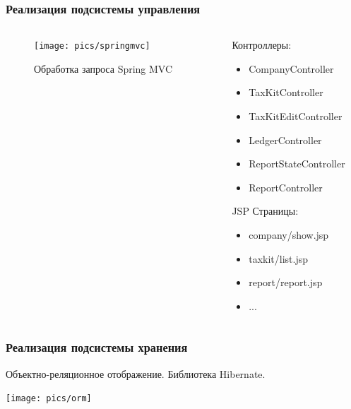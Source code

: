 \documentclass[xcolor=pdftex, dvipsnames, table]{beamer}
\begin{document}
\begin{frame}
  \frametitle{Реализация подсистемы управления}
  \begin{columns}
    \begin{column}{0.6\textwidth}
      \begin{center}
        \begin{figure}
          \texttt{[image: pics/springmvc]}
          \caption{Обработка запроса Spring MVC}
          \label{pic:springmvc}
        \end{figure}
      \end{center}
    \end{column}
    \begin{column}{0.5\textwidth}
      Контроллеры:
      \begin{itemize}
        \item CompanyController
        \item TaxKitController
        \item TaxKitEditController
        \item LedgerController
        \item ReportStateController
        \item ReportController
      \end{itemize}
      JSP Страницы:
      \begin{itemize}
        \item company/show.jsp
        \item taxkit/list.jsp
        \item report/report.jsp
        \item ...
      \end{itemize}
    \end{column}
  \end{columns}
\end{frame}

\begin{frame}
  \frametitle{Реализация подсистемы хранения}
  Объектно-реляционное отображение.  Библиотека Hibernate.
  \begin{center}
    \texttt{[image: pics/orm]}
  \end{center}
\end{frame}
\end{document}
